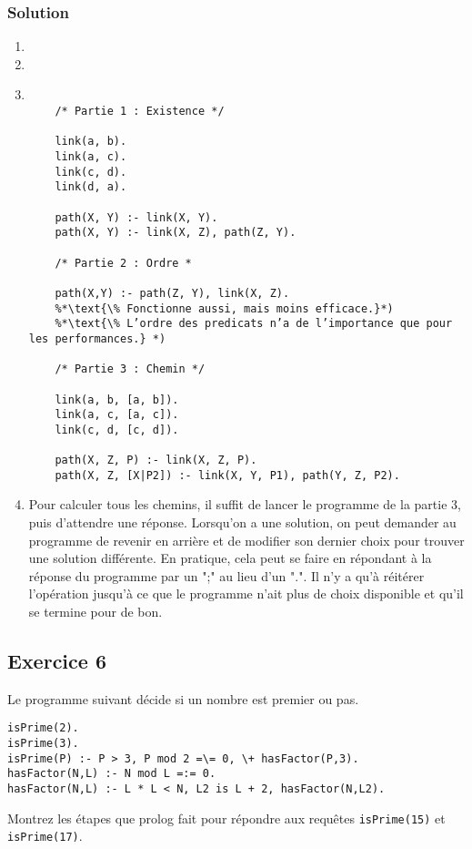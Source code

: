     \subsubsection*{Solution}
    \begin{enumerate}
    \item 
    \item
    \item
 
    \begin{lstlisting}
    
    /* Partie 1 : Existence */
    
    link(a, b).
    link(a, c).
    link(c, d).
    link(d, a).
    
    path(X, Y) :- link(X, Y).
    path(X, Y) :- link(X, Z), path(Z, Y).
    
    /* Partie 2 : Ordre *
    
    path(X,Y) :- path(Z, Y), link(X, Z).
    %*\text{\% Fonctionne aussi, mais moins efficace.}*)
    %*\text{\% L’ordre des predicats n’a de l’importance que pour les performances.} *)
    
    /* Partie 3 : Chemin */
    
    link(a, b, [a, b]).
    link(a, c, [a, c]).
    link(c, d, [c, d]).
    
    path(X, Z, P) :- link(X, Z, P).
    path(X, Z, [X|P2]) :- link(X, Y, P1), path(Y, Z, P2).
    \end{lstlisting}
    
    \item Pour calculer tous les chemins, il suffit de lancer le programme de la partie 3, puis d'attendre une réponse.
    Lorsqu'on a une solution, on peut demander au programme de revenir en arrière et de modifier son dernier choix pour trouver une solution différente.
    En pratique, cela peut se faire en répondant à la réponse du programme par un ";" au lieu d'un ".".
    Il n'y a qu'à réitérer l'opération jusqu'à ce que le programme n'ait plus de choix disponible et qu'il se termine pour de bon.
    
   \end{enumerate}
\subsection*{Exercice 6}
Le programme suivant d\'{e}cide si un nombre est premier ou pas.

\begin{verbatim}
isPrime(2).
isPrime(3).
isPrime(P) :- P > 3, P mod 2 =\= 0, \+ hasFactor(P,3).  
hasFactor(N,L) :- N mod L =:= 0.
hasFactor(N,L) :- L * L < N, L2 is L + 2, hasFactor(N,L2). 
\end{verbatim}
Montrez les \'{e}tapes que prolog fait pour r\'{e}pondre aux requ\^{e}tes \texttt{isPrime(15)} et \texttt{isPrime(17)}.

